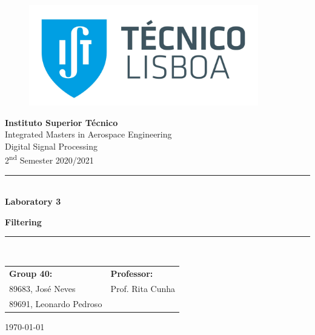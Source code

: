 \documentclass[a4paper, oneside, 11pt]{article}
\begin{document}
\begin{titlepage}
	\begin{center}
		\begin{figure}[htb!]
			\centering
				\includegraphics[width=10cm]{figures/istlogo.jpg}
		\end{figure}
        
        \LARGE{\textbf{Instituto Superior Técnico}}\\
        \vspace{20pt}
        \Large{Integrated Masters in Aerospace Engineering}\\
        \vspace{10pt}
        \Large{Digital Signal Processing}\\
        \vspace{10pt}
        \Large{2\textsuperscript{nd} Semester 2020/2021}\\
            
        \vspace{40pt}
        \noindent\rule{15cm}{1pt}\\
        \Huge{\center \textbf{Laboratory 3}} 
        \par 
        \Huge{\center \textbf{Filtering}}\\
        \noindent\rule{15cm}{1pt}\\
        
        \vspace{60pt}
        \large{\begin{tabular}{ll}
            \textbf{Group 40:} & \textbf{Professor:} \\
            89683, José Neves & Prof. Rita Cunha\\
            89691, Leonardo Pedroso \hspace{1cm} & \\
        \end{tabular}}
    
        \vspace{60pt}
        \large{\today}
	\end{center}
\end{titlepage}
\end{document}
